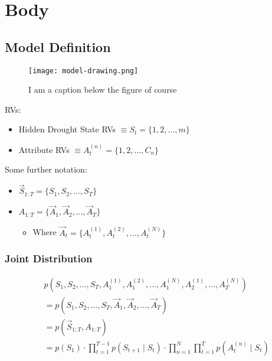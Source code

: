 \graphicspath{{body/fig/}}

\chapter{Body}
\label{chap:body}

\section{Model Definition}

\begin{figure}[!h]
    \centering
    \texttt{[image: model-drawing.png]}
    \caption[I am the short caption that appears in the list of figures, without references.]{ I am a caption below the figure of course}
    \label{fig:model-drawing}
\end{figure}

RVs:
\begin{itemize}
    \item Hidden Drought State RVs $\equiv S_t = \{1,2,\dots,m\}$    
    \item Attribute RVs $\equiv A^{(n)}_t = \{1,2,\dots,C_n\}$
\end{itemize}

Some further notation:
\begin{itemize}
    \item $\vec{S}_{1:T}  = \{S_1,S_2,\dots,S_T\}$    
    \item $A_{1:T} = \{\vec{A}_1,\vec{A}_2,\dots,\vec{A}_T\}$
    \begin{itemize}
        \item Where $\vec{A}_t = \{ A^{(1)}_t, A^{(2)}_t, \dots, A^{(N)}_t\}$
    \end{itemize}
\end{itemize}


\subsection{Joint Distribution}

\[
\begin{align}
    &p(S_1, S_2, \dots, S_T, A^{(1)}_1, A^{(2)}_1, \dots, A^{(N)}_1, A^{(1)}_2, \dots, A^{(N)}_T) \\ 
    &= p(S_1, S_2, \dots, S_T, \vec{A}_1, \vec{A}_2, \dots, \vec{A}_T) \\
    &= p(\vec{S}_{1:T}, A_{1:T}) \\
    &= p(S_1) \cdot \prod\limits_{t=1}^{T-1} p(S_{t+1} \mid S_t) \cdot \prod\limits_{n=1}^{N} \prod\limits_{t=1}^T p(A^{(n)}_t \mid S_t)
\end{align}
\]

